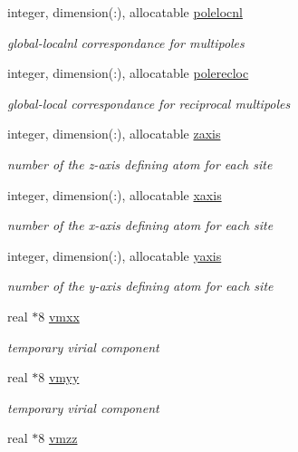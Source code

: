 \begin{DoxyCompactItemize}
integer, dimension(\-:), allocatable \hyperlink{classmpole_a6e9bb6e7c48dd3b2622a3a3ed88f0cb9}{polelocnl}
\begin{DoxyCompactList}\small\item\em global-\/localnl correspondance for multipoles \end{DoxyCompactList}\item 
integer, dimension(\-:), allocatable \hyperlink{classmpole_a782e3c5c7f9957625e165e5cf1fe70c0}{polerecloc}
\begin{DoxyCompactList}\small\item\em global-\/local correspondance for reciprocal multipoles \end{DoxyCompactList}\item 
integer, dimension(\-:), allocatable \hyperlink{classmpole_acc3be383ead6de1c43b0406211e74582}{zaxis}
\begin{DoxyCompactList}\small\item\em number of the z-\/axis defining atom for each site \end{DoxyCompactList}\item 
integer, dimension(\-:), allocatable \hyperlink{classmpole_a4b8e5a845d51a21ac98e83e1b7e2becb}{xaxis}
\begin{DoxyCompactList}\small\item\em number of the x-\/axis defining atom for each site \end{DoxyCompactList}\item 
integer, dimension(\-:), allocatable \hyperlink{classmpole_a794e9bdc1e6b42890a05233beb552613}{yaxis}
\begin{DoxyCompactList}\small\item\em number of the y-\/axis defining atom for each site \end{DoxyCompactList}\item 
real $\ast$8 \hyperlink{classmpole_a5125a1d93c843fb12e7e93c2d0db9a22}{vmxx}
\begin{DoxyCompactList}\small\item\em temporary virial component \end{DoxyCompactList}\item 
real $\ast$8 \hyperlink{classmpole_ab856a6193585e78195db20ad8237f1d0}{vmyy}
\begin{DoxyCompactList}\small\item\em temporary virial component \end{DoxyCompactList}\item 
real $\ast$8 \hyperlink{classmpole_affa102e85a9871ed8ffd4988cec33ee8}{vmzz}

\end{DoxyCompactItemize}
